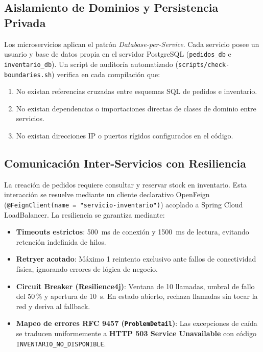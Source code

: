 \documentclass[12pt,a4paper]{article}
\begin{document}
\subsection{Aislamiento de Dominios y Persistencia Privada}
Los microservicios aplican el patr\'{o}n \textit{Database-per-Service}. Cada servicio posee un usuario y base de datos propia en el servidor PostgreSQL (\texttt{pedidos\_db} e \texttt{inventario\_db}). Un script de auditor\'{i}a automatizado (\texttt{scripts/check-boundaries.sh}) verifica en cada compilaci\'{o}n que:
\begin{enumerate}
    \item No existan referencias cruzadas entre esquemas SQL de pedidos e inventario.
    \item No existan dependencias o importaciones directas de clases de dominio entre servicios.
    \item No existan direcciones IP o puertos r\'{i}gidos configurados en el c\'{o}digo.
\end{enumerate}

\subsection{Comunicaci\'{o}n Inter-Servicios con Resiliencia}
La creaci\'{o}n de pedidos requiere consultar y reservar stock en inventario. Esta interacci\'{o}n se resuelve mediante un cliente declarativo OpenFeign (\texttt{@FeignClient(name = "servicio-inventario")}) acoplado a Spring Cloud LoadBalancer. La resiliencia se garantiza mediante:
\begin{itemize}
    \item \textbf{Timeouts estrictos}: 500~ms de conexi\'{o}n y 1500~ms de lectura, evitando retenci\'{o}n indefinida de hilos.
    \item \textbf{Retryer acotado}: M\'{a}ximo 1 reintento exclusivo ante fallos de conectividad f\'{i}sica, ignorando errores de l\'{o}gica de negocio.
    \item \textbf{Circuit Breaker (Resilience4j)}: Ventana de 10 llamadas, umbral de fallo del 50\,\% y apertura de 10~s. En estado abierto, rechaza llamadas sin tocar la red y deriva al fallback.
    \item \textbf{Mapeo de errores RFC 9457 (\texttt{ProblemDetail})}: Las excepciones de ca\'{i}da se traducen uniformemente a \textbf{HTTP 503 Service Unavailable} con c\'{o}digo \texttt{INVENTARIO\_NO\_DISPONIBLE}.
\end{itemize}
\end{document}
